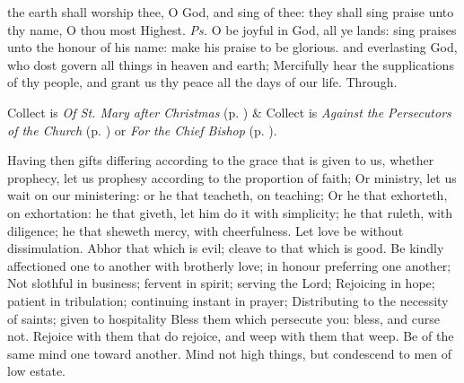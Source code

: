 \introit
{} the earth shall worship thee, O God, and sing of thee: they shall sing praise unto thy name, O thou most Highest. \textit{Ps.} O be joyful in God, all ye lands: sing praises unto the honour of his name: make his praise to be glorious.
\collect\label{EpiphanyIICollect}
 and everlasting God, who dost govern all things in heaven and earth; Mercifully hear the supplications of thy people, and grant us thy peace all the days of our life. Through.
\begin{rubric}
     Collect is \emph{Of St. Mary after Christmas} (p. \pageref{SPMaryPostChristmas}) \&  Collect is \emph{Against the Persecutors of the Church} (p. \pageref{SPAgainst}) or \emph{For the Chief Bishop} (p. \pageref{SPChiefBishop}).
\end{rubric}
 Having then gifts differing according to the grace that is given to us, whether prophecy, let us prophesy according to the proportion of faith; Or ministry, let us wait on our ministering: or he that teacheth, on teaching; Or he that exhorteth, on exhortation: he that giveth, let him do it with simplicity; he that ruleth, with diligence; he that sheweth mercy, with cheerfulness. Let love be without dissimulation. Abhor that which is evil; cleave to that which is good. Be kindly affectioned one to another with brotherly love; in honour preferring one another; Not slothful in business; fervent in spirit; serving the Lord; Rejoicing in hope; patient in tribulation; continuing instant in prayer; Distributing to the necessity of saints; given to hospitality Bless them which persecute you: bless, and curse not. Rejoice with them that do rejoice, and weep with them that weep. Be of the same mind one toward another. Mind not high things, but condescend to men of low estate.

